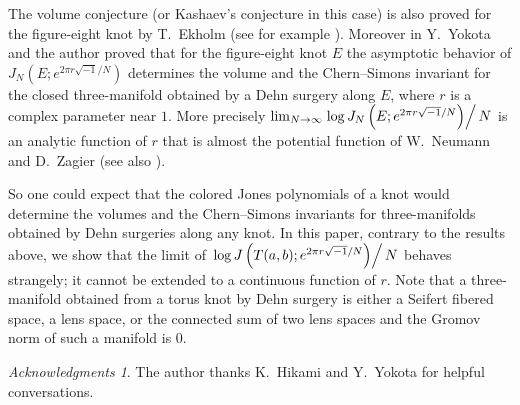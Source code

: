 \documentclass[a4paper,draft]{amsart}
\theoremstyle{plain}
\theoremstyle{definition}
\theoremstyle{remark}
\newtheorem*{ack}{Acknowledgments}
\numberwithin{equation}{section}
\begin{document}
The volume conjecture (or Kashaev's conjecture in this case) is also proved for
the figure-eight knot by T.~Ekholm (see for example
\cite{Murakami:ALDT_VI}).
Moreover in \cite{Murakami/Yokota:2004} Y.~Yokota and the author proved that
for the figure-eight knot $E$ the asymptotic behavior of
$J_N\left(E;e^{2\pi{r}\sqrt{-1}/N}\right)$
determines the volume and the Chern--Simons invariant for the closed
three-manifold obtained by a Dehn surgery along $E$, where $r$ is a complex
parameter near $1$.
More precisely
$\lim_{N\to\infty}\left.\log{J_N\left(E;e^{2\pi{r}\sqrt{-1}/N}\right)}\right/N$
is an analytic function of $r$ that is almost the potential function of
W.~Neumann and D.~Zagier \cite{Neumann/Zagier:TOPOL85} (see also
\cite{Yoshida:INVEM85}).
\par
So one could expect that the colored Jones polynomials of a knot would determine
the volumes and the Chern--Simons invariants for three-manifolds obtained by
Dehn surgeries along any knot.
In this paper, contrary to the results above, we show that the limit of
$\left.\log{J\left(T(a,b);e^{2\pi{r}\sqrt{-1}/N}\right)}\right/N$
behaves strangely; it cannot be extended to a continuous function of $r$.
Note that a three-manifold obtained from a torus knot by Dehn surgery is either
a Seifert fibered space, a lens space, or the connected sum of two lens spaces
\cite{Moser:PACJM1971} and the Gromov norm of such a manifold is $0$.
\begin{ack}
The author thanks K.~Hikami and Y.~Yokota for helpful conversations.
\end{ack}
\end{document}
